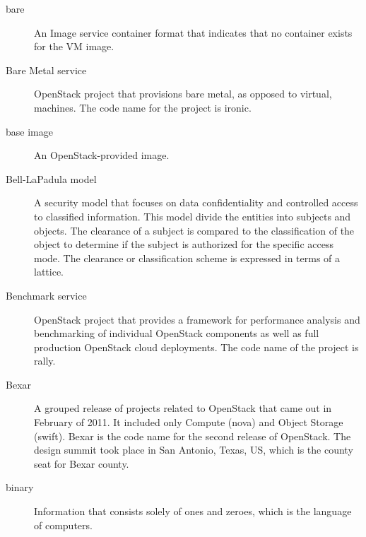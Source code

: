 \documentclass[letterpaper,10pt,english]{sphinxmanual}
\begin{document}
\begin{description}
\item[{bare}] \leavevmode{}\label{_source/glossary:term-bare}
An Image service container format that indicates that no
container exists for the VM image.

\item[{Bare Metal service}] \leavevmode{}\label{_source/glossary:term-bare-metal-service}
OpenStack project that provisions bare metal, as opposed to
virtual, machines. The code name for the project is ironic.

\item[{base image}] \leavevmode{}\label{_source/glossary:term-base-image}
An OpenStack-provided image.

\item[{Bell-LaPadula model}] \leavevmode{}\label{_source/glossary:term-bell-lapadula-model}
A security model that focuses on data confidentiality
and controlled access to classified information.
This model divide the entities into subjects and objects.
The clearance of a subject is compared to the classification of the
object to determine if the subject is authorized for the specific access mode.
The clearance or classification scheme is expressed in terms of a lattice.

\item[{Benchmark service}] \leavevmode{}\label{_source/glossary:term-benchmark-service}
OpenStack project that provides a framework for
performance analysis and benchmarking of individual
OpenStack components as well as full production OpenStack
cloud deployments. The code name of the project is rally.

\item[{Bexar}] \leavevmode{}\label{_source/glossary:term-bexar}
A grouped release of projects related to
OpenStack that came out in February of 2011. It
included only Compute (nova) and Object Storage (swift).
Bexar is the code name for the second release of
OpenStack. The design summit took place in
San Antonio, Texas, US, which is the county seat for Bexar county.

\item[{binary}] \leavevmode{}\label{_source/glossary:term-binary}
Information that consists solely of ones and zeroes, which is
the language of computers.


\end{description}
\end{document}
